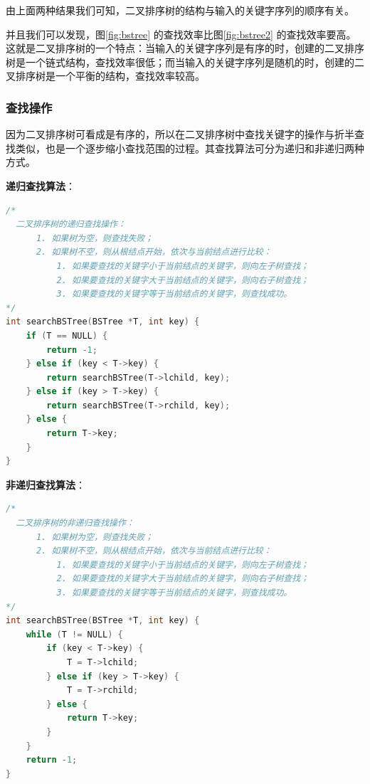 \documentclass[lang=cn,newtx,10pt,scheme=chinese]{../elegantbook}
\begin{document}
由上面两种结果我们可知，二叉排序树的结构与输入的关键字序列的顺序有关。

并且我们可以发现，图\ref{fig:bstree} 的查找效率比图\ref{fig:bstree2} 的查找效率要高。
这就是二叉排序树的一个特点：当输入的关键字序列是有序的时，创建的二叉排序树是一个链式结构，查找效率很低；而当输入的关键字序列是随机的时，创建的二叉排序树是一个平衡的结构，查找效率较高。



\subsubsection{查找操作}

因为二叉排序树可看成是有序的，所以在二叉排序树中查找关键字的操作与折半查找类似，也是一个逐步缩小查找范围的过程。其查找算法可分为递归和非递归两种方式。

\textbf{递归查找算法}：

\begin{lstlisting}[language=C++, caption={二叉排序树的递归查找操作}]
  /*
  二叉排序树的递归查找操作：
      1. 如果树为空，则查找失败；
      2. 如果树不空，则从根结点开始，依次与当前结点进行比较：
          1. 如果要查找的关键字小于当前结点的关键字，则向左子树查找；
          2. 如果要查找的关键字大于当前结点的关键字，则向右子树查找；
          3. 如果要查找的关键字等于当前结点的关键字，则查找成功。
*/
int searchBSTree(BSTree *T, int key) {
    if (T == NULL) {
        return -1;
    } else if (key < T->key) {
        return searchBSTree(T->lchild, key);
    } else if (key > T->key) {
        return searchBSTree(T->rchild, key);
    } else {
        return T->key;
    }
}
\end{lstlisting}

\textbf{非递归查找算法}：

\begin{lstlisting}[language=C++, caption={二叉排序树的非递归查找操作}]
  /*
  二叉排序树的非递归查找操作：
      1. 如果树为空，则查找失败；
      2. 如果树不空，则从根结点开始，依次与当前结点进行比较：
          1. 如果要查找的关键字小于当前结点的关键字，则向左子树查找；
          2. 如果要查找的关键字大于当前结点的关键字，则向右子树查找；
          3. 如果要查找的关键字等于当前结点的关键字，则查找成功。
*/
int searchBSTree(BSTree *T, int key) {
    while (T != NULL) {
        if (key < T->key) {
            T = T->lchild;
        } else if (key > T->key) {
            T = T->rchild;
        } else {
            return T->key;
        }
    }
    return -1;
}
\end{lstlisting}
\end{document}
